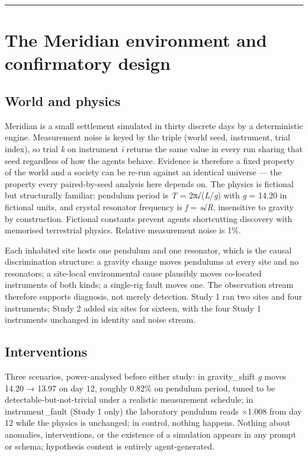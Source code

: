 \documentclass[pdflatex,sn-basic]{sn-jnl}
\begin{document}
\begin{center}\rule{0.5\linewidth}{0.5pt}\end{center}

\hypertarget{the-meridian-environment-and-confirmatory-design}{%
\section{The Meridian environment and confirmatory design}\label{the-meridian-environment-and-confirmatory-design}}

\hypertarget{world-and-physics}{%
\subsection{World and physics}\label{world-and-physics}}

Meridian is a small settlement simulated in thirty discrete days by
a deterministic engine. Measurement noise is keyed by the triple (world seed, instrument,
trial index), so trial \emph{k} on instrument \emph{i} returns the same value in every run sharing
that seed regardless of how the agents behave. Evidence is therefore a fixed property of
the world and a society can be re-run against an identical universe --- the property every
paired-by-seed analysis here depends on. The physics is fictional but structurally
familiar: pendulum period is \emph{T} = 2π√(\emph{L}/\emph{g}) with \emph{g} = 14.20 in fictional units, and
crystal resonator frequency is \emph{f} = \emph{s}√\emph{R}, insensitive to gravity by construction.
Fictional constants prevent agents shortcutting discovery with memorised terrestrial
physics. Relative measurement noise is 1\%.

Each inhabited site hosts one pendulum and one resonator, which is the causal
discrimination structure: a gravity change moves pendulums at every site and no
resonators; a site-local environmental cause plausibly moves co-located instruments of
both kinds; a single-rig fault moves one. The observation stream therefore supports
diagnosis, not merely detection. Study 1 ran two sites and four instruments; Study 2 added
six sites for sixteen, with the four Study 1 instruments unchanged in identity and noise
stream.

\hypertarget{interventions}{%
\subsection{Interventions}\label{interventions}}

Three scenarios, power-analysed before either study: in gravity\_shift
\emph{g} moves 14.20 → 13.97 on day 12, roughly 0.82\% on pendulum period, tuned to be
detectable-but-not-trivial under a realistic measurement schedule; in instrument\_fault
(Study 1 only) the laboratory pendulum reads ×1.008 from day 12 while the physics is
unchanged; in control, nothing happens. Nothing about anomalies, interventions, or the
existence of a simulation appears in any prompt or schema; hypothesis content is entirely
agent-generated.
\end{document}
